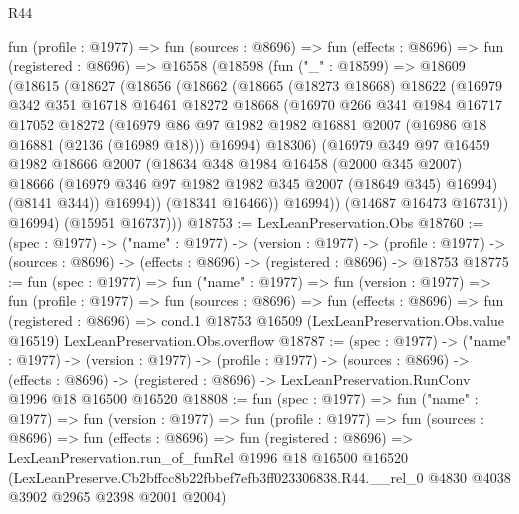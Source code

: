 \begin{lexlean}{R44}
\begin{coremodule}
  fun (profile : @1977) =>
  fun (sources : @8696) =>
  fun (effects : @8696) =>
  fun (registered : @8696) =>
  @16558
    (@18598
      (fun ("_" : @18599) =>
      @18609
        (@18615
          (@18627
            (@18656
              (@18662
                (@18665
                  (@18273 @18668)
                  @18622
                  (@16979
                    @342
                    @351
                    @16718
                    @16461
                    @18272
                    @18668
                    (@16970
                      @266
                      @341
                      @1984
                      @16717
                      @17052
                      @18272
                      (@16979
                        @86
                        @97
                        @1982
                        @1982
                        @16881
                        @2007
                        (@16986 @18 @16881 (@2136 (@16989 @18)))
                        @16994)
                      @18306)
                    (@16979
                      @349
                      @97
                      @16459
                      @1982
                      @18666
                      @2007
                      (@18634
                        @348
                        @1984
                        @16458
                        (@2000 @345 @2007)
                        @18666
                        (@16979 @346 @97 @1982 @1982 @345 @2007 (@18649 @345) @16994)
                        (@8141 @344))
                      @16994))
                  (@18341 @16466))
                @16994))
            (@14687 @16473 @16731))
          @16994)
        (@15951 @16737)))
@18753 := LexLeanPreservation.Obs
@18760 := (spec : @1977) ->
  ("name" : @1977) ->
  (version : @1977) ->
  (profile : @1977) -> (sources : @8696) -> (effects : @8696) -> (registered : @8696) -> @18753
@18775 := fun (spec : @1977) =>
  fun ("name" : @1977) =>
  fun (version : @1977) =>
  fun (profile : @1977) =>
  fun (sources : @8696) =>
  fun (effects : @8696) =>
  fun (registered : @8696) =>
  cond.{1} @18753 @16509 (LexLeanPreservation.Obs.value @16519) LexLeanPreservation.Obs.overflow
@18787 := (spec : @1977) ->
  ("name" : @1977) ->
  (version : @1977) ->
  (profile : @1977) ->
  (sources : @8696) ->
  (effects : @8696) -> (registered : @8696) -> LexLeanPreservation.RunConv @1996 @18 @16500 @16520
@18808 := fun (spec : @1977) =>
  fun ("name" : @1977) =>
  fun (version : @1977) =>
  fun (profile : @1977) =>
  fun (sources : @8696) =>
  fun (effects : @8696) =>
  fun (registered : @8696) =>
  LexLeanPreservation.run_of_funRel
    @1996
    @18
    @16500
    @16520
    (LexLeanPreserve.Cb2bffcc8b22fbbef7efb3ff023306838.R44.__rel_0
      @4830
      @4038
      @3902
      @2965
      @2398
      @2001
      @2004)
\end{coremodule}
\end{lexlean}
